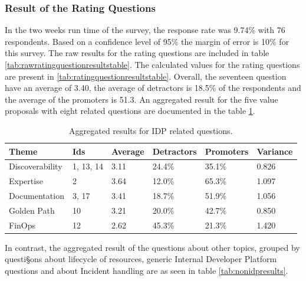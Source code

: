 \documentclass[a4paper,12pt]{article}
\begin{document}
    \subsubsection{Result of the Rating Questions}
    \label{sssec:rratque}
    In the two weeks run time of the survey, the response rate was 9.74\% with 76 respondents.
    Based on a confidence level of 95\% the margin of error is 10\% for this survey.
    The raw results for the rating questions are included in table \ref{tab:rawratingquestionresultstable}.
    The calculated values for the rating questions are present in \ref{tab:ratingquestionresultstable}.
    Overall, the seventeen question have an average of 3.40, the average of detractors is 18.5\% of the
    respondents and the average of the promoters is 51.3.
    An aggregated result for the five value proposals with eight related questions are documented in the table \ref{tab:aggregateidpresults}.
    \begin{table}[!htbp]
        \begin{center}
            \begin{tabularx}{\textwidth}{llllll}
                \toprule
                Theme           & Ids       & Average & Detractors & Promoters & Variance \\
                \midrule
                Discoverability & 1, 13, 14 & 3.11    & 24.4\%     & 35.1\%    & 0.826    \\
                Expertise       & 2         & 3.64    & 12.0\%     & 65.3\%    & 1.097    \\
                Documentation   & 3, 17     & 3.41    & 18.7\%     & 51.9\%    & 1.056    \\
                Golden Path     & 10        & 3.21    & 20.0\%     & 42.7\%    & 0.850    \\
                FinOps          & 12        & 2.62    & 45.3\%     & 21.3\%    & 1.420    \\
                \bottomrule
            \end{tabularx}
        \end{center}
        \caption{\label{tab:aggregateidpresults} Aggregated results for IDP related questions.}
    \end{table}

    In contrast, the aggregated result of the questions about other topics, grouped by questi§ons about lifecycle of resources,
    generic Internal Developer Platform questions and about Incident handling are as seen in table \ref{tab:nonidpresults}.
\end{document}
